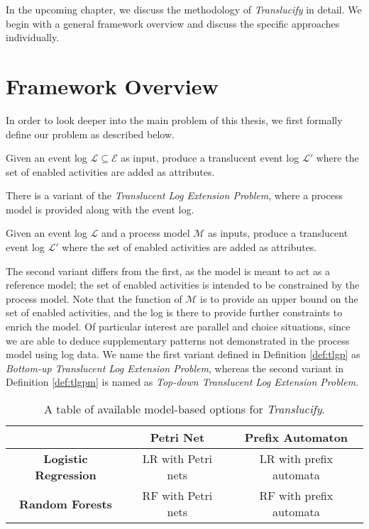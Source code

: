 In the upcoming chapter, we discuss the methodology of \emph{Translucify} in detail. We begin with a general framework overview and discuss the specific approaches individually.

\section{Framework Overview}
In order to look deeper into the main problem of this thesis, we first formally define our problem as described below.

\begin{definition}
\label{def:tlgp}
    Given an event log $\mathcal{L} \subseteq \mathcal{E}$ as input, produce a translucent event log $\mathcal{L'}$ where the set of enabled activities are added as attributes. 
\end{definition}

There is a variant of the \emph{Translucent Log Extension Problem}, where a process model is provided along with the event log.

\begin{definition}
\label{def:tlgpm}
    Given an event log $\mathcal{L}$ and a process model $\mathcal{M}$ as inputs, produce a translucent event log $\mathcal{L'}$ where the set of enabled activities are added as attributes. 
\end{definition}

The second variant differs from the first, as the model is meant to act as a reference model; the set of enabled activities is intended to be constrained by the process model. Note that the function of $\mathcal{M}$ is to provide an upper bound on the set of enabled activities, and the log is there to provide further constraints to enrich the model. Of particular interest are parallel and choice situations, since we are able to deduce supplementary patterns not demonstrated in the process model using log data. We name the first variant defined in Definition \ref{def:tlgp} as \emph{Bottom-up Translucent Log Extension Problem}, whereas the second variant in Definition \ref{def:tlgpm} is named as \emph{Top-down Translucent Log Extension Problem.}


\begin{table}[h!]
    \centering
	\caption{A table of available model-based options for \emph{Translucify}.}
    \begin{tabular}{|c|c|c|}
        \hline
        & \textbf{Petri Net} & \textbf{Prefix Automaton} \\ 
        \hline
        \textbf{Logistic Regression} & LR with Petri nets & LR with prefix automata \\
        \hline
        \textbf{Random Forests} & RF with Petri nets & RF with prefix automata \\
        \hline
    \end{tabular}
    \label{tab:framework_overview}
\end{table}

